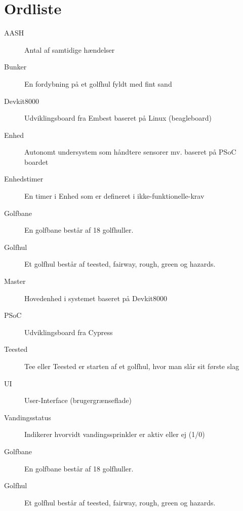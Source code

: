 \chapter{Ordliste}


\begin{description}

\item[AASH] Antal af samtidige hændelser
\item[Bunker] En fordybning på et golfhul fyldt med fint sand
\item[Devkit8000] Udviklingsboard fra Embest baseret på Linux (beagleboard)
\item[Enhed] Autonomt undersystem som håndtere sensorer mv. baseret på PSoC boardet
\item[Enhedstimer] En timer i Enhed som er defineret i ikke-funktionelle-krav
\item[Golfbane] En golfbane består af 18 golfhuller.
\item[Golfhul] Et golfhul består af teested, fairway, rough, green og hazards.
\item[Master] Hovedenhed i systemet baseret på Devkit8000
\item[PSoC] Udviklingsboard fra Cypress
\item[Teested] Tee eller Teested er starten af et golfhul, hvor man slår sit første slag
\item[UI] User-Interface (brugergrænseflade)
\item[Vandingsstatus] Indikerer hvorvidt vandingssprinkler er aktiv eller ej (1/0)
\item[Golfbane] En golfbane består af 18 golfhuller.
\item[Golfhul] Et golfhul består af teested, fairway, rough, green og hazards. 


\end{description}